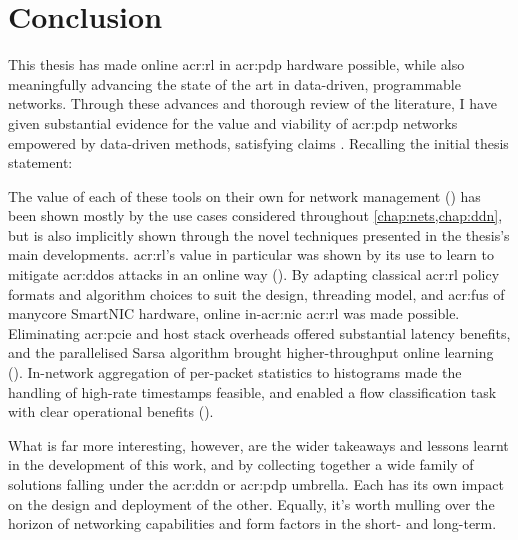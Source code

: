 \chapter{Conclusion}\label{chap:conclusion}
This thesis has made online \gls{acr:rl} in \gls{acr:pdp} hardware possible, while also meaningfully advancing the state of the art in data-driven, programmable networks.
%
Through these advances and thorough review of the literature, I have given substantial evidence for the value and viability of \gls{acr:pdp} networks empowered by data-driven methods, satisfying claims .
Recalling the initial thesis statement:
\begin{quotation}
	\noindent
\end{quotation}
The value of each of these tools on their own for network management () has been shown mostly by the use cases considered throughout \cref{chap:nets,chap:ddn}, but is also implicitly shown through the novel techniques presented in the thesis's main developments.
\gls{acr:rl}'s value in particular was shown by its use to learn to mitigate \gls{acr:ddos} attacks in an online way ().
By adapting classical \gls{acr:rl} policy formats and algorithm choices to suit the design, threading model, and \glspl{acr:fu} of manycore SmartNIC hardware, online in-\gls{acr:nic} \gls{acr:rl} was made possible.
Eliminating \gls{acr:pcie} and host stack overheads offered substantial latency benefits, and the parallelised Sarsa algorithm brought higher-throughput online learning ().
In-network aggregation of per-packet statistics to histograms made the handling of high-rate timestamps feasible, and enabled a flow classification task with clear operational benefits ().

What is far more interesting, however, are the wider takeaways and lessons learnt in the development of this work, and by collecting together a wide family of solutions falling under the \gls{acr:ddn} or \gls{acr:pdp} umbrella.
Each has its own impact on the design and deployment of the other.
Equally, it's worth mulling over the horizon of networking capabilities and form factors in the short- and long-term.

